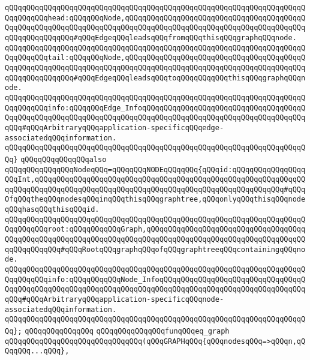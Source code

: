 \verb|qQQqqQQqqQQqqQQqqQQqqQQqqQQqqQQqqQQqqQQqqQQqqQQqqQQqqQQqqQQqqQQqqQQqqQQqqQQqqQQqhead:qQQqqQQqNode,qQQqqQQqqQQqqQQqqQQqqQQqqQQqqQQqqQQqqQQqqQQqqQQqqQQqqQQqqQQqqQQqqQQqqQQqqQQqqQQqqQQqqQQqqQQqqQQqqQQqqQQqqQQqqQQqqQQqqQQqqQQqqQQq#qQQqEdgeqQQqleadsqQQqfromqQQqthisqQQqgraphqQQqnode.|\newline
\verb|qQQqqQQqqQQqqQQqqQQqqQQqqQQqqQQqqQQqqQQqqQQqqQQqqQQqqQQqqQQqqQQqqQQqqQQqqQQqqQQqtail:qQQqqQQqNode,qQQqqQQqqQQqqQQqqQQqqQQqqQQqqQQqqQQqqQQqqQQqqQQqqQQqqQQqqQQqqQQqqQQqqQQqqQQqqQQqqQQqqQQqqQQqqQQqqQQqqQQqqQQqqQQqqQQqqQQqqQQqqQQq#qQQqEdgeqQQqleadsqQQqtoqQQqqQQqqQQqthisqQQqgraphqQQqnode.|\newline
\verb|qQQqqQQqqQQqqQQqqQQqqQQqqQQqqQQqqQQqqQQqqQQqqQQqqQQqqQQqqQQqqQQqqQQqqQQqqQQqqQQqinfo:qQQqqQQqEdge_InfoqQQqqQQqqQQqqQQqqQQqqQQqqQQqqQQqqQQqqQQqqQQqqQQqqQQqqQQqqQQqqQQqqQQqqQQqqQQqqQQqqQQqqQQqqQQqqQQqqQQqqQQqqQQqqQQq#qQQqArbitraryqQQqapplication-specificqQQqedge-associatedqQQqinformation.|\newline
\verb|qQQqqQQqqQQqqQQqqQQqqQQqqQQqqQQqqQQqqQQqqQQqqQQqqQQqqQQqqQQqqQQqqQQqqQQq}|\newline
\verb|qQQqqQQqqQQqqQQqalso|\newline
\verb|qQQqqQQqqQQqqQQqNodeqQQq=qQQqqQQqNODEqQQqqQQq{qQQqid:qQQqqQQqqQQqqQQqqQQqInt,qQQqqQQqqQQqqQQqqQQqqQQqqQQqqQQqqQQqqQQqqQQqqQQqqQQqqQQqqQQqqQQqqQQqqQQqqQQqqQQqqQQqqQQqqQQqqQQqqQQqqQQqqQQqqQQqqQQqqQQqqQQqqQQq#qQQqOfqQQqtheqQQqnodesqQQqinqQQqthisqQQqgraphtree,qQQqonlyqQQqthisqQQqnodeqQQqhasqQQqthisqQQqid.|\newline
\verb|qQQqqQQqqQQqqQQqqQQqqQQqqQQqqQQqqQQqqQQqqQQqqQQqqQQqqQQqqQQqqQQqqQQqqQQqqQQqqQQqroot:qQQqqQQqqQQqGraph,qQQqqQQqqQQqqQQqqQQqqQQqqQQqqQQqqQQqqQQqqQQqqQQqqQQqqQQqqQQqqQQqqQQqqQQqqQQqqQQqqQQqqQQqqQQqqQQqqQQqqQQqqQQqqQQqqQQqqQQq#qQQqRootqQQqgraphqQQqofqQQqgraphtreeqQQqcontainingqQQqnode.|\newline
\verb|qQQqqQQqqQQqqQQqqQQqqQQqqQQqqQQqqQQqqQQqqQQqqQQqqQQqqQQqqQQqqQQqqQQqqQQqqQQqqQQqinfo:qQQqqQQqqQQqNode_InfoqQQqqQQqqQQqqQQqqQQqqQQqqQQqqQQqqQQqqQQqqQQqqQQqqQQqqQQqqQQqqQQqqQQqqQQqqQQqqQQqqQQqqQQqqQQqqQQqqQQqqQQqqQQq#qQQqArbitraryqQQqapplication-specificqQQqnode-associatedqQQqinformation.|\newline
\verb|qQQqqQQqqQQqqQQqqQQqqQQqqQQqqQQqqQQqqQQqqQQqqQQqqQQqqQQqqQQqqQQqqQQqqQQq};|\newline
\verb|qQQqqQQqqQQqqQQq|\newline
\verb|qQQqqQQqqQQqqQQqfunqQQqeq_graph|\newline
\verb|qQQqqQQqqQQqqQQqqQQqqQQqqQQqqQQq(qQQqGRAPHqQQq{qQQqnodesqQQq=>qQQqn,qQQqqQQq...qQQq},|\newline
